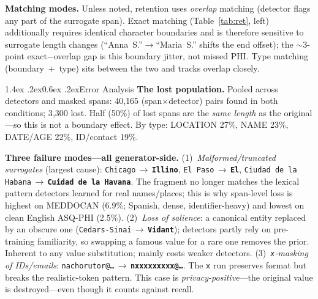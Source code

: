 \documentclass[11pt]{article}
\makeatletter
\newcommand{\oldv}[1]{\textcolor{cclay}{#1}}
\newcommand{\newv}[1]{\textcolor{caccent}{\textbf{#1}}}
\newcommand{\arr}{\,$\rightarrow$\,\allowbreak}
\renewcommand\section{\@startsection{section}{1}{\z@}%
  {1.4ex \@plus.2ex}{0.6ex \@plus.2ex}{\normalfont\large\bfseries}}
\newcommand{\tp}[1]{\texttt{#1}}
\makeatother
\begin{document}
\textbf{Matching modes.} Unless noted, retention uses \emph{overlap} matching (detector flags any part of the surrogate span). Exact matching (Table~\ref{tab:ret}, left) additionally requires identical character boundaries and is therefore sensitive to surrogate length changes (``Anna~S.''$\rightarrow$``Maria~S.'' shifts the end offset); the $\sim$3-point exact$-$overlap gap is this boundary jitter, not missed PHI. Type matching (boundary~+~type) sits between the two and tracks overlap closely.

\section{Error Analysis}\label{sec:error}
\textbf{The lost population.} Pooled across detectors and masked spans: 40{,}165 (span$\times$detector) pairs found in both conditions; 3{,}300 lost. Half (50\%) of lost spans are the \emph{same length} as the original---so this is not a boundary effect. By type: LOCATION 27\%, NAME 23\%, DATE/AGE 22\%, ID/contact 19\%.

\textbf{Three failure modes---all generator-side.}
(1)~\emph{Malformed/truncated surrogates} (largest cause): \oldv{\tp{Chicago}}\arr\newv{\tp{Illino}}, \oldv{\tp{El~Paso}}\arr\newv{\tp{El}}, \oldv{\tp{Ciudad de la Habana}}\arr\newv{\tp{Cuidad de la Havana}}. The fragment no longer matches the lexical pattern detectors learned for real names/places; this is why span-level loss is highest on MEDDOCAN (6.9\%; Spanish, dense, identifier-heavy) and lowest on clean English ASQ-PHI (2.5\%).
(2)~\emph{Loss of salience}: a canonical entity replaced by an obscure one (\oldv{\tp{Cedars-Sinai}}\arr\newv{\tp{Vidant}}); detectors partly rely on pre-training familiarity, so swapping a famous value for a rare one removes the prior. Inherent to any value substitution; mainly costs weaker detectors.
(3)~\emph{\tp{x}-masking of IDs/emails}: \oldv{\tp{nachorutor@\dots}}\arr\newv{\tp{nxxxxxxxxx@\dots}}. The \tp{x} run preserves format but breaks the realistic-token pattern. This case is \emph{privacy-positive}---the original value is destroyed---even though it counts against recall.
\end{document}
